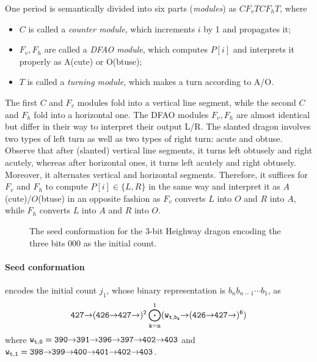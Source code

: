 \documentclass[runningheads]{llncs}
\newcommand{\east}{{\ensuremath \to}}
\begin{document}
One period is semantically divided into six parts (\textit{modules}) as $C F_v T C F_h T$, where %
\begin{itemize}
\item $C$ is called a \textit{counter module}, which increments $i$ by 1 and propagates it; 
\item $F_v, F_h$ are called a \textit{DFAO module}, which computes $P[i]$ and interprets it properly as A(cute) or O(btuse); 
\item $T$ is called a \textit{turning module}, which makes a turn according to A/O. 
\end{itemize}
The first $C$ and $F_v$ modules fold into a vertical line segment, while the second $C$ and $F_h$ fold into a horizontal one. 
The DFAO modules $F_v, F_h$ are almost identical but differ in their way to interpret their output L/R. 
The slanted dragon involves two types of left turn as well as two types of right turn: acute and obtuse. 
Observe that after (slanted) vertical line segments, it turns left obtusely and right acutely, whereas after horizontal ones, it turns left acutely and right obtusely. 
Moreover, it alternates vertical and horizontal segments. 
Therefore, it suffices for $F_v$ and $F_h$ to compute $P[i] \in \{L, R\}$ in the same way and interpret it as $A$(cute)/$O$(btuse) in an opposite fashion as $F_v$ converts $L$ into $O$ and $R$ into $A$, while $F_h$ converts $L$ into $A$ and $R$ into $O$. 

\begin{figure}[tb]

\caption{The seed conformation for the 3-bit Heighway dragon encoding the three bits 000 as the initial count.}
\label{fig:seed}
\end{figure}

\paragraph{Seed conformation} encodes the initial count $j_1$, whose binary representation is $b_n b_{n-1} \cdots b_1$, as
\begin{equation}\label{eq:turner_output}{\tt 
	427 \east (426 \east 427 \east)^2 \bigodot_{k = n}^1 (w_{t, b_k} \east (426 \east 427 \east)^6)
}\end{equation}
where ${\tt w_{t, 0} = 390 \east 391 \east 396 \east 397 \east 402 \east 403}$ and ${\tt w_{t, 1} = 398 \east 399 \east 400 \east 401 \east 402 \east 403}$. 
\end{document}
